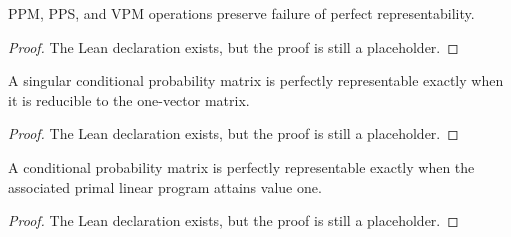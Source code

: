 \begin{lemma}
\label{lem:preserve-nonrepr}
PPM, PPS, and VPM operations preserve failure of perfect representability.
\end{lemma}

\begin{proof}
\notready
{}
The Lean declaration exists, but the proof is still a placeholder.
\end{proof}

\begin{theorem}
\label{thm:characterization}
A singular conditional probability matrix is perfectly representable exactly when it is reducible to the one-vector matrix.
\end{theorem}

\begin{proof}
\notready
{}
The Lean declaration exists, but the proof is still a placeholder.
\end{proof}

\begin{theorem}
\label{thm:linear-program}
A conditional probability matrix is perfectly representable exactly when the associated primal linear program attains value one.
\end{theorem}

\begin{proof}
\notready
{}
The Lean declaration exists, but the proof is still a placeholder.
\end{proof}